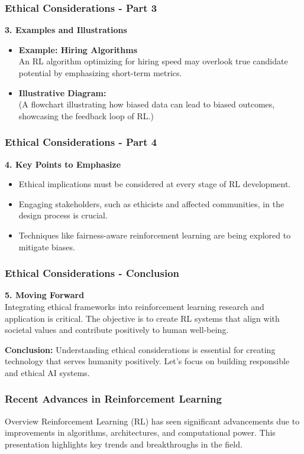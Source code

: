 \documentclass[aspectratio=169]{beamer}
\begin{document}
\begin{frame}[fragile]
    \frametitle{Ethical Considerations - Part 3}
    \textbf{3. Examples and Illustrations}

    \begin{itemize}
        \item \textbf{Example: Hiring Algorithms} \\
        An RL algorithm optimizing for hiring speed may overlook true candidate potential by emphasizing short-term metrics.
        
        \item \textbf{Illustrative Diagram:} \\
        (A flowchart illustrating how biased data can lead to biased outcomes, showcasing the feedback loop of RL.)
    \end{itemize}
\end{frame}

\begin{frame}[fragile]
    \frametitle{Ethical Considerations - Part 4}
    \textbf{4. Key Points to Emphasize}
    
    \begin{itemize}
        \item Ethical implications must be considered at every stage of RL development.
        \item Engaging stakeholders, such as ethicists and affected communities, in the design process is crucial.
        \item Techniques like fairness-aware reinforcement learning are being explored to mitigate biases.
    \end{itemize}
\end{frame}

\begin{frame}[fragile]
    \frametitle{Ethical Considerations - Conclusion}
    \textbf{5. Moving Forward} \\
    Integrating ethical frameworks into reinforcement learning research and application is critical. The objective is to create RL systems that align with societal values and contribute positively to human well-being.
    
    \textbf{Conclusion:} Understanding ethical considerations is essential for creating technology that serves humanity positively. Let's focus on building responsible and ethical AI systems.
\end{frame}

\begin{frame}
    \frametitle{Recent Advances in Reinforcement Learning}
    \begin{block}{Overview}
        Reinforcement Learning (RL) has seen significant advancements due to improvements in algorithms, architectures, and computational power. This presentation highlights key trends and breakthroughs in the field.
    \end{block}
\end{frame}
\end{document}
